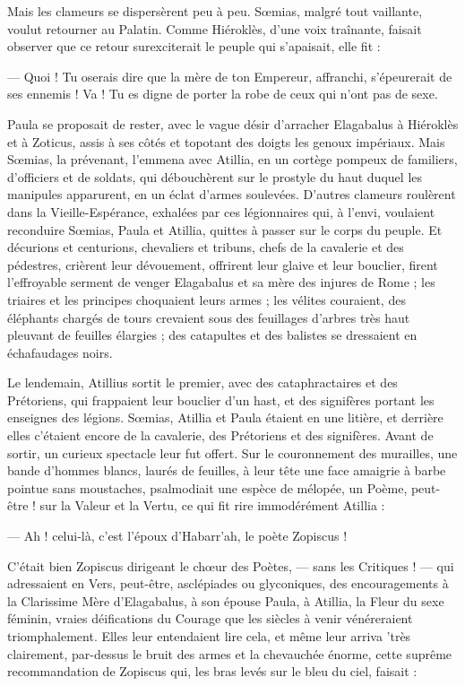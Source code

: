 \documentclass[a4paper, 11pt, oneside, polutonikogreek, french]{article}
\begin{document}
Mais les clameurs se dispersèrent peu à peu. Sœmias, malgré tout vaillante, voulut retourner au Palatin. Comme Hiéroklès, d'une voix traînante, faisait observer que ce retour surexciterait le peuple qui s'apaisait, elle fit :

--- Quoi ! Tu oserais dire que la mère de ton Empereur, affranchi, s'épeurerait de ses ennemis ! Va ! Tu es digne de porter la robe de ceux qui n'ont pas de sexe.

Paula se proposait de rester, avec le vague désir d'arracher Elagabalus à Hiéroklès et à Zoticus, assis à ses côtés et topotant des doigts les genoux impériaux. Mais Sœmias, la prévenant, l'emmena avec Atillia, en un cortège pompeux de familiers, d'officiers et de soldats, qui débouchèrent sur le prostyle du haut duquel les manipules apparurent, en un éclat d'armes soulevées. D'autres clameurs roulèrent dans la Vieille-Espérance, exhalées par ces légionnaires qui, à l'envi, voulaient reconduire Sœmias, Paula et Atillia, quittes à passer sur le corps du peuple. Et décurions et centurions, chevaliers et tribuns, chefs de la cavalerie et des pédestres, crièrent leur dévouement, offrirent leur glaive et leur bouclier, firent l'effroyable serment de venger Elagabalus et sa mère des injures de Rome ; les triaires et les principes choquaient leurs armes ; les vélites couraient, des éléphants chargés de tours crevaient sous des feuillages d'arbres très haut pleuvant de feuilles élargies ; des catapultes et des balistes se dressaient en échafaudages noirs.

Le lendemain, Atillius sortit le premier, avec des cataphractaires et des Prétoriens, qui frappaient leur bouclier d'un hast, et des signifères portant les enseignes des légions. Sœmias, Atillia et Paula étaient en une litière, et derrière elles c'étaient encore de la cavalerie, des Prétoriens et des signifères. Avant de sortir, un curieux spectacle leur fut offert. Sur le couronnement des murailles, une bande d'hommes blancs, laurés de feuilles, à leur tête une face amaigrie à barbe pointue sans moustaches, psalmodiait une espèce de mélopée, un Poème, peut-être ! sur la Valeur et la Vertu, ce qui fit rire immodérément Atillia :

--- Ah ! celui-là, c'est l'époux d'Habarr'ah, le poète Zopiscus !

C'était bien Zopiscus dirigeant le chœur des Poètes, --- sans les Critiques ! --- qui adressaient en Vers, peut-être, asclépiades ou glyconiques, des encouragements à la Clarissime Mère d'Elagabalus, à son épouse Paula, à Atillia, la Fleur du sexe féminin, vraies déifications du Courage que les siècles à venir vénéreraient triomphalement. Elles leur entendaient lire cela, et même leur arriva 'très clairement, par-dessus le bruit des armes et la chevauchée énorme, cette suprême recommandation de Zopiscus qui, les bras levés sur le bleu du ciel, faisait :
\end{document}
